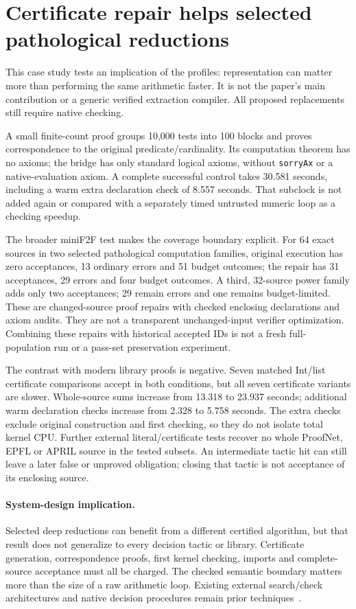 \documentclass[10pt,twocolumn]{article}
\begin{document}
\section{Certificate repair helps selected pathological reductions}
\label{sec:certificates}
This case study tests an implication of the profiles: representation can
matter more than performing the same arithmetic faster.
It is not the paper's main contribution or a generic verified extraction
compiler. All proposed replacements still require native checking.

A small finite-count proof groups 10,000 tests into 100 blocks and proves
correspondence to the original predicate/cardinality.
Its computation theorem has no axioms; the bridge has only standard logical
axioms, without \texttt{sorryAx} or a native-evaluation axiom.
A complete successful control takes 30.581 seconds, including a warm extra
declaration check of 8.557 seconds.
That subclock is not added again or compared with a separately timed
untrusted numeric loop as a checking speedup.

The broader miniF2F test makes the coverage boundary explicit.
For 64 exact sources in two selected pathological computation families,
original execution has zero acceptances, 13 ordinary errors and 51 budget
outcomes; the repair has 31 acceptances, 29 errors and four budget outcomes.
A third, 32-source power family adds only two acceptances; 29 remain errors
and one remains budget-limited. These are changed-source proof repairs with
checked enclosing declarations and axiom audits.
They are not a transparent unchanged-input verifier optimization.
Combining these repairs with historical accepted IDs is not a fresh
full-population run or a pass-set preservation experiment.

The contrast with modern library proofs is negative.
Seven matched Int/list certificate comparisons accept in both conditions,
but all seven certificate variants are slower.
Whole-source sums increase from 13.318 to 23.937 seconds; additional warm
declaration checks increase from 2.328 to 5.758 seconds.
The extra checks exclude original construction and first checking, so they
do not isolate total kernel CPU.
Further external literal/certificate tests recover no whole ProofNet,
EPFL or APRIL source in the tested subsets.
An intermediate tactic hit can still leave a later false or unproved
obligation; closing that tactic is not acceptance of its enclosing source.

\paragraph{System-design implication.}
Selected deep reductions can benefit from a different certified algorithm,
but that result does not generalize to every decision tactic or library.
Certificate generation, correspondence proofs, first kernel checking,
imports and complete-source acceptance must all be charged.
The checked semantic boundary matters more than the size of a raw arithmetic
loop. Existing external search/check architectures and native decision
procedures remain prior techniques~\cite{mathlib,lean49DecideSource}.
\end{document}
